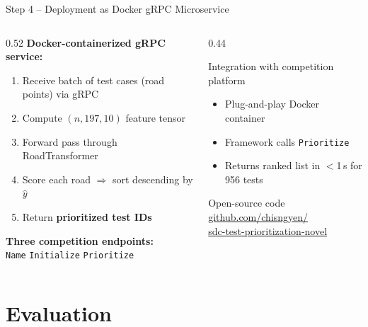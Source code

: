\documentclass[aspectratio=169,10pt]{beamer}
\begin{document}
\begin{frame}{Step 4 -- Deployment as Docker gRPC Microservice}
  \begin{columns}[T]
    \begin{column}{0.52\linewidth}
      \textbf{Docker-containerized gRPC service:}
      \vspace{4pt}
      \begin{enumerate}
        \item Receive batch of test cases (road points) via gRPC
        \item Compute $(n, 197, 10)$ feature tensor
        \item Forward pass through RoadTransformer
        \item Score each road $\Rightarrow$ sort descending by $\hat{y}$
        \item Return \textbf{prioritized test IDs}
      \end{enumerate}
      \vspace{8pt}
      \textbf{Three competition endpoints:}\\
      \texttt{Name} \quad \texttt{Initialize} \quad \texttt{Prioritize}
    \end{column}
    \begin{column}{0.44\linewidth}
      \begin{block}{Integration with competition platform}
        \begin{itemize}
          \item Plug-and-play Docker container
          \item Framework calls \texttt{Prioritize}
          \item Returns ranked list in $<$1\,s for 956 tests
        \end{itemize}
      \end{block}
      \vspace{6pt}
      \begin{alertblock}{Open-source code}
        \small\url{github.com/chisngyen/}\\
        \url{sdc-test-prioritization-novel}
      \end{alertblock}
    \end{column}
  \end{columns}
\end{frame}

\section{Evaluation}
\end{document}
